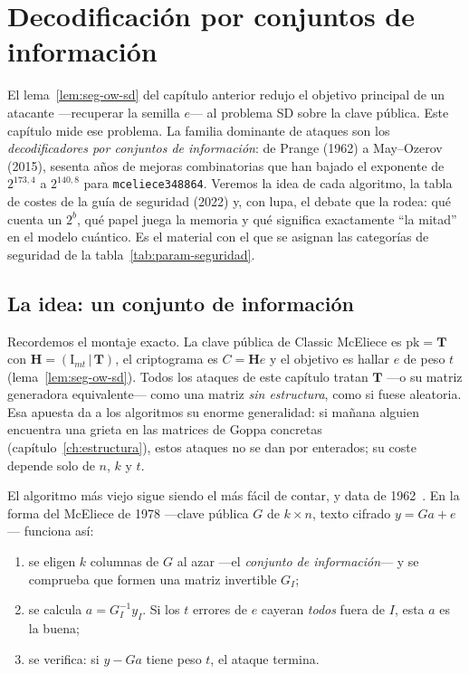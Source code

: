 \documentclass[11pt,a4paper,oneside]{report}
\newcommand{\Hmat}{\mathbf{H}}          %
\newcommand{\Tmat}{\mathbf{T}}          %
\begin{document}
\chapter{Decodificación por conjuntos de información}\label{ch:isd}

\begin{roadmap}
El lema~\ref{lem:seg-ow-sd} del capítulo anterior redujo el objetivo
principal de un atacante ---recuperar la semilla $e$--- al problema
SD sobre la clave pública. Este capítulo mide ese problema. La
familia dominante de ataques son los \emph{decodificadores por
conjuntos de información}: de Prange (1962) a May--Ozerov (2015),
sesenta años de mejoras combinatorias que han bajado el exponente de
$2^{173{,}4}$ a $2^{140{,}8}$ para \texttt{mceliece348864}. Veremos la
idea de cada algoritmo, la tabla de costes de la guía de seguridad
(2022) y, con lupa, el debate que la rodea: qué cuenta un $2^b$, qué
papel juega la memoria y qué significa exactamente ``la mitad'' en el
modelo cuántico. Es el material con el que se asignan las categorías
de seguridad de la tabla~\ref{tab:param-seguridad}.
\end{roadmap}

\section{La idea: un conjunto de información}

Recordemos el montaje exacto. La clave pública de Classic McEliece es
$\mathrm{pk}=\Tmat$ con $\Hmat=(\mathrm{I}_{mt}\,|\,\Tmat)$, el
criptograma es $C=\Hmat e$ y el objetivo es hallar $e$ de peso $t$
(lema~\ref{lem:seg-ow-sd}). Todos los ataques de este capítulo tratan
$\Tmat$ ---o su matriz generadora equivalente--- como una matriz
\emph{sin estructura}, como si fuese aleatoria. Esa apuesta da a los
algoritmos su enorme generalidad: si mañana alguien encuentra una
grieta en las matrices de Goppa concretas (capítulo~\ref{ch:estructura}),
estos ataques no se dan por enterados; su coste depende solo de
$n$, $k$ y $t$.

El algoritmo más viejo sigue siendo el más fácil de contar, y data de
1962~\cite{prange1962}. En la forma del McEliece de 1978 ---clave
pública $G$ de $k\times n$, texto cifrado $y=Ga+e$--- funciona así:

\begin{enumerate}[leftmargin=1.8em,itemsep=2pt]
  \item se eligen $k$ columnas de $G$ al azar ---el
        \emph{conjunto de información}--- y se comprueba que formen
        una matriz invertible $G_I$;
  \item se calcula $a=G_I^{-1}y_I$. Si los $t$ errores de $e$
        cayeran \emph{todos} fuera de $I$, esta $a$ es la buena;
  \item se verifica: si $y-Ga$ tiene peso $t$, el ataque termina.
\end{enumerate}
\end{document}
